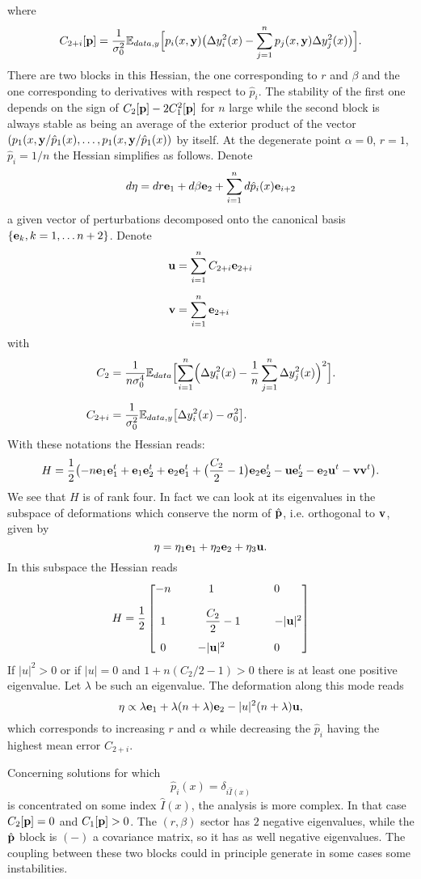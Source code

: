 where
\[
C_{2+i}[{\bf p}] = \frac{1}{\sigma_0^2}{\mathbb E}_{data,y}
\Bigl[ p_i(x,{\bf y})\bigl(\Delta y_i^2(x)-\sum_{j=1}^np_j(x,{\bf y})\Delta y_j^2(x)\bigr)\Bigr].
\]
There are two blocks in this Hessian, the one corresponding to $r$ and $\beta$ and the one corresponding to derivatives with respect to $\hat p_i$.
The stability of the first one depends on the sign of $C_2[{\bf p}]-2C_1^2[{\bf p}]$ for $n$ large while the second block
is always stable as being an average of the exterior product of the vector $(p_1(x,{\bf y}/\hat p_1(x),\ldots,p_1(x,{\bf y}/\hat p_1(x))$
by itself. At the degenerate point $\alpha=0$, $r=1$, $\hat  p_i=1/n$ the Hessian simplifies as follows. Denote
\[
{d{\bf \eta}} = dr{\bf e}_1+d\beta{\bf e}_2+\sum_{i=1}^n d\hat p_i(x){\bf e}_{i+2}
\]
a given vector of perturbations decomposed onto the canonical basis $\{{\bf e}_k,k=1,\ldots n+2\}$.
Denote
\begin{align*}
{\bf u} &= \sum_{i=1}^n C_{2+i} {\bf e}_{2+i}\\[0.2cm]    
{\bf v} &= \sum_{i=1}^n  {\bf e}_{2+i}
\end{align*}
with
\begin{align*}
C_2 &= \frac{1}{n\sigma_0^4}{\mathbb E}_{data}\Bigl[\sum_{i=1}^n \Bigl(\Delta y_i^2(x)-\frac{1}{n}\sum_{j=1}^n\Delta y_j^2(x)\Bigr)^2\Bigr].\\[0.2cm]
C_{2+i} &= \frac{1}{\sigma_0^2}{\mathbb E}_{data,y}
\bigl[\Delta y_i^2(x)-\sigma_0^2\bigr].
\end{align*}
With these notations the Hessian reads: 
\[
H = \frac{1}{2}\bigl(-n{\bf e}_1{\bf e}_1^t+{\bf e}_1{\bf e}_2^t+{\bf e}_2{\bf e}_1^t+\bigl(\frac{C_2}{2}-1\bigr){\bf e}_2{\bf e}_2^t
-{\bf u}{\bf e}_2^t-{\bf e}_2{\bf u}^t-{\bf v}{\bf v}^t\bigr).
\]
We see that $H$ is of rank four. In fact we can look at its eigenvalues in the subspace of deformations
which conserve the norm of $\hat {\bf p}$, i.e. orthogonal to ${\bf v}$, given by
\[
{\bf \eta} = \eta_1{\bf e}_1+\eta_2{\bf e}_2+\eta_3{\bf u}.
\]
In this subspace the Hessian reads
\[
H =\frac{1}{2}
\left[
  \begin{matrix}
 -n & 1 &0 \\[0.4cm] 
 1 & \qquad\displaystyle \frac{C_2}{2}-1&\qquad-\vert {\bf u}\vert^2  \\[0.4cm]
 0& -\vert {\bf u}\vert^2 &0 
  \end{matrix}
  \right]
\]
If $|u|^2>0$ or  if $|u|=0$ and $1+n(C_2/2-1)>0$ there is at least one positive eigenvalue. Let $\lambda$ be such an eigenvalue.
The deformation along this mode reads
\[
{\bf \eta} \propto \lambda{\bf e}_1+\lambda(n+\lambda){\bf e}_2-|u|^2(n+\lambda){\bf u},
\]
which corresponds to increasing $r$ and $\alpha$ while decreasing the $\hat p_i$ having the highest mean error $C_{2+i}$.

\noindent Concerning solutions for which
\[
\hat p_i(x) = \delta_{i\hat I(x)}
\]
is concentrated on some index $\hat I(x)$,  the analysis is more complex. In that case $C_2[{\bf p}]=0$ and $C_1[{\bf p}] >0$. The $(r,\beta)$ sector has $2$ negative eigenvalues, while the $\hat {\bf p}$ block is $(-)$ a covariance matrix, so it has as well negative eigenvalues. The coupling between these  two blocks could in principle generate in some cases some instabilities.
